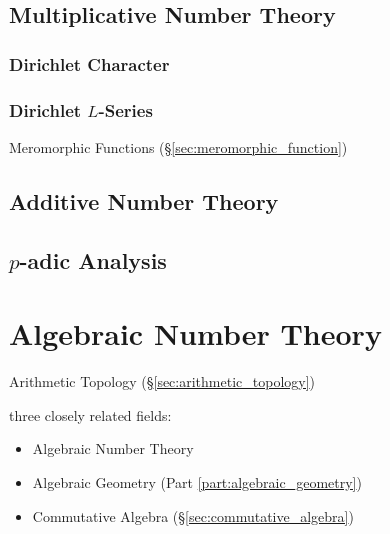 \subsection{Multiplicative Number Theory}
\label{sec:multiplicative_number_theory}

\subsubsection{Dirichlet Character}\label{sec:dirichlet_character}

\subsubsection{Dirichlet $L$-Series}\label{sec:l_series}

Meromorphic Functions (\S\ref{sec:meromorphic_function})



\subsection{Additive Number Theory}\label{sec:additive_number_theory}

\subsection{$p$-adic Analysis}\label{sec:padic_analysis}



\section{Algebraic Number Theory}\label{sec:algebraic_number_theory}

Arithmetic Topology (\S\ref{sec:arithmetic_topology})

three closely related fields:
\begin{itemize}
  \item Algebraic Number Theory
  \item Algebraic Geometry (Part \ref{part:algebraic_geometry})
  \item Commutative Algebra (\S\ref{sec:commutative_algebra})
\end{itemize}




